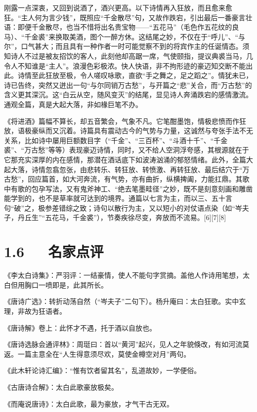 \documentclass[letterpaper,12pt,english]{sphinxmanual}
\begin{document}
刚露一点深衷，又回到说酒了，酒兴更高。以下诗情再入狂放，而且愈来愈狂。“主人何为言少钱”，既照应“千金散尽”句，又故作跌宕，引出最后一番豪言壮语：即便千金散尽，也当不惜将出名贵宝物——“五花马”（毛色作五花纹的良马）、“千金裘”来换取美酒，图个一醉方休。这结尾之妙，不仅在于“呼儿”、“与尔”，口气甚大；而且具有一种作者一时可能觉察不到的将宾作主的任诞情态。须知诗人不过是被友招饮的客人，此刻他却高踞一席，气使颐指，提议典裘当马，几令人不知谁是“主人”。浪漫色彩极浓。快人快语，非不拘形迹的豪迈知交断不能出此。诗情至此狂放至极，令人嗟叹咏歌，直欲“手之舞之，足之蹈之”。情犹未已，诗已告终，突然又迸出一句“与尔同销万古愁”，与开篇之“悲”关合，而“万古愁”的含义更其深沉。这“白云从空，随风变灭”的结尾，显见诗人奔涌跌宕的感情激流。通观全篇，真是大起大落，非如椽巨笔不办。

《将进酒》篇幅不算长，却五音繁会，气象不凡。它笔酣墨饱，情极悲愤而作狂放，语极豪纵而又沉着。诗篇具有震动古今的气势与力量，这诚然与夸张手法不无关系，比如诗中屡用巨额数目字（“千金”、“三百杯”、“斗酒十千”、“千金裘”、“万古愁”等等）表现豪迈诗情，同时，又不给人空洞浮夸感，其根源就在于它那充实深厚的内在感情，那潜在酒话底下如波涛汹涌的郁怒情绪。此外，全篇大起大落，诗情忽翕忽张，由悲转乐、转狂放、转愤激、再转狂放、最后结穴于“万古愁”，回应篇首，如大河奔流，有气势，亦有曲折，纵横捭阖，力能扛鼎。其歌中有歌的包孕写法，又有鬼斧神工、“绝去笔墨畦径”之妙，既不是刻意刻画和雕凿能学到的，也不是草率就可达到的境界。通篇以七言为主，而以三、五十言句“破”之，极参差错综之致；诗句以散行为主，又以短小的对仗语点染（如“岑夫子，丹丘生”“五花马，千金裘”），节奏疾徐尽变，奔放而不流易。{[}6{]}{[}7{]}{[}8{]}


\section{1.6   名家点评}
\label{\detokenize{p01_u6563_u6587/_u674e_u767d-_u5c06_u8fdb_u9152:id8}}
《李太白诗集》：严羽评：一结豪情，使人不能句字赏摘。盖他人作诗用笔想，太白但用胸口一喷即是，此其所长。

《唐诗广选》：转折动荡自然（“岑夫子”二句下）。杨升庵曰：太白狂歌。实中玄理，非故为狂语者。

《唐诗解》卷上：此怀才不遇，托于酒以自放也。

《唐诗选脉会通评林》：周珽曰：首以“黄河”起兴，见人之年貌倏改，有如河流莫返。一篇主意全在“人生得意须尽欢，莫使金樽空对月”两句。

《此木轩论诗汇编》：“惟有饮者留其名”，乱道故妙，一学便俗。

《古唐诗合解》：太白此歌豪放极矣。

《而庵说唐诗》：太白此歌，最为豪放，才气干古无双。
\end{document}
